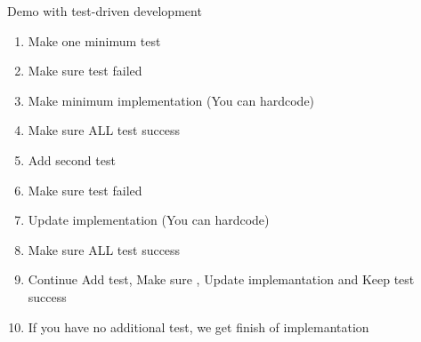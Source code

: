 \begin{frame}[plain]
  {Demo with test-driven development}

  \begin{enumerate}
    \item Make one minimum test
    \item Make sure test failed
    \item Make minimum implementation (You can hardcode)
    \item Make sure \alert{ALL} test success
    \item Add second test
    \item Make sure test failed
    \item Update implementation (You can hardcode)
    \item Make sure \alert{ALL} test success
    \item Continue Add test, Make sure , Update implemantation and Keep test success
    \item If you have no additional test, we get finish of implemantation
  \end{enumerate}
\end{frame}
